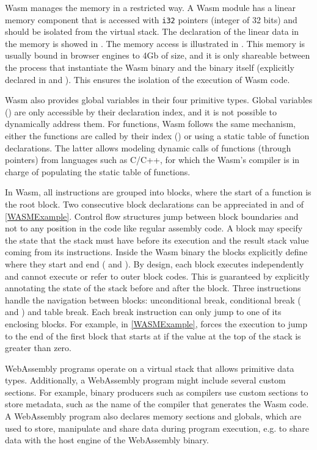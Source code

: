 Wasm  manages the memory in a restricted way. A Wasm  module has a linear memory component that is accessed with \texttt{i32} pointers (integer of 32 bits) and should be isolated from the virtual stack. The declaration of the linear data in the memory is showed in . The memory access is illustrated in . This memory is usually bound in browser engines to 4Gb of size, and it is only shareable between the process that instantiate the Wasm  binary and the binary itself (explicitly declared in  and ). This ensures the isolation of the execution of Wasm  code. 

Wasm  also provides global variables in their four primitive types. Global variables () are only accessible by their declaration index, and it is not possible to dynamically address them. For functions, Wasm  follows the same mechanism, either the functions are called by their index () or using a static table of function declarations. The latter allows modeling dynamic calls of functions (through pointers) from languages such as C/C++, for which the Wasm's compiler is in charge of populating the static table of functions.


In Wasm, all instructions are grouped into blocks, where the start of a function is the root block. Two consecutive block declarations can be appreciated in  and  of \autoref{WASMExample}. Control flow structures jump between block boundaries and not to any position in the code like regular assembly code. A block may specify the state that the stack must have before its execution and the result stack value coming from its instructions. Inside the Wasm  binary the blocks explicitly define where they start and end ( and ). By design, each block executes independently and cannot execute or refer to outer block codes. This is guaranteed by explicitly annotating the state of the stack before and after the block. Three instructions handle the navigation between blocks: unconditional break, conditional break ( and ) and table break. Each break instruction can only jump to one of its enclosing blocks. For example, in \autoref{WASMExample},  forces the execution to jump to the end of the first block that starts at  if the value at the top of the stack is greater than zero.



WebAssembly programs operate on a virtual stack that allows primitive data types.
Additionally, a WebAssembly program might include several custom sections.
For example, binary producers such as compilers use custom sections to store metadata, such as the name of the compiler that generates the Wasm code.
A WebAssembly program also declares memory sections and globals, which are used to store, manipulate and share data during program execution, e.g. to share data with the host engine of the WebAssembly binary.

